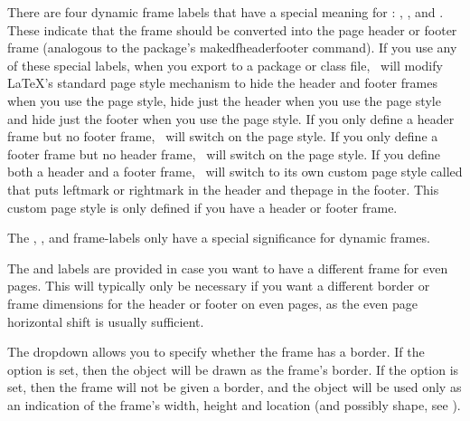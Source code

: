 There are four dynamic frame labels that have a special meaning for
\FlowframTk: ,
,
 and
. These indicate that the frame should be converted
into the page header or footer frame (analogous to the
 package's \gls{makedfheaderfooter} command).
If you use any of these special labels, when you export to a package or
class file, \FlowframTk\ will modify \LaTeX's standard page style
mechanism to hide the header and footer frames when you use the
 page style, hide just the header when you use the
 page style and hide just the footer when you use the
 page style. If you only define a header frame but
no footer frame, \FlowframTk\ will switch on the 
page style. If you only define a footer frame but no header frame,
\FlowframTk\ will switch on the  page style. If you
define both a header and a footer frame, \FlowframTk\ will switch to
its own custom page style called  that puts
\gls{leftmark} or \gls{rightmark} in the header and
\gls{thepage} in the footer. This custom page style is
only defined if you have a header or footer frame.

\begin{important}
The , ,
 and  
\glspl{frame-label} only have a special significance for dynamic frames.
\end{important}

The  and  labels are provided
in case you want to have a different frame for even pages. This will
typically only be necessary if you want a different border or frame
dimensions for the header or footer on even pages, as the
even page horizontal shift is usually sufficient.


The  \gls*{dropdown} allows you
to specify whether the frame has a border. If the option
 is set, then the
\gls{object} will be drawn as the frame's border. If the option
 is set, then the frame will
not be given a border, and the object will be used only as an
indication of the frame's width, height and location (and
possibly shape, see ).

